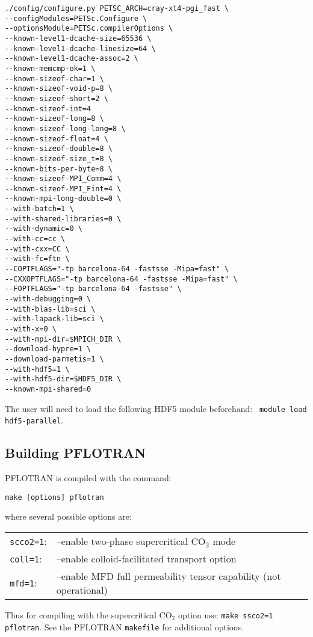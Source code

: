 \footnotesize
\begin{verbatim}
./config/configure.py PETSC_ARCH=cray-xt4-pgi_fast \
--configModules=PETSc.Configure \
--optionsModule=PETSc.compilerOptions \
--known-level1-dcache-size=65536 \
--known-level1-dcache-linesize=64 \
--known-level1-dcache-assoc=2 \
--known-memcmp-ok=1 \
--known-sizeof-char=1 \
--known-sizeof-void-p=8 \
--known-sizeof-short=2 \
--known-sizeof-int=4
--known-sizeof-long=8 \
--known-sizeof-long-long=8 \
--known-sizeof-float=4 \
--known-sizeof-double=8 \
--known-sizeof-size_t=8 \
--known-bits-per-byte=8 \
--known-sizeof-MPI_Comm=4 \
--known-sizeof-MPI_Fint=4 \
--known-mpi-long-double=0 \
--with-batch=1 \
--with-shared-libraries=0 \
--with-dynamic=0 \
--with-cc=cc \
--with-cxx=CC \
--with-fc=ftn \
--COPTFLAGS="-tp barcelona-64 -fastsse -Mipa=fast" \
--CXXOPTFLAGS="-tp barcelona-64 -fastsse -Mipa=fast" \
--FOPTFLAGS="-tp barcelona-64 -fastsse" \
--with-debugging=0 \
--with-blas-lib=sci \
--with-lapack-lib=sci \
--with-x=0 \
--with-mpi-dir=$MPICH_DIR \
--download-hypre=1 \
--download-parmetis=1 \
--with-hdf5=1 \
--with-hdf5-dir=$HDF5_DIR \
--known-mpi-shared=0
\end{verbatim}
\normalsize
The user will need to load the following HDF5 module beforehand: \ \verb|module load hdf5-parallel|.

\subsection{Building PFLOTRAN}
 
PFLOTRAN is compiled with the command:

\verb|make [options] pflotran|

\noindent
where several possible options are: 

\begin{tabular}{ll}
\verb|scco2=1|: & --enable two-phase supercritical CO$_2$ mode\\
\verb|coll=1|: & --enable colloid-facilitated transport option\\
\verb|mfd=1|: & --enable MFD full permeability tensor capability (not operational)
\end{tabular}

\noindent
Thus for compiling with the supercritical CO$_2$ option use: {\tt make ssco2=1 pflotran}.
See the PFLOTRAN \verb|makefile| for additional options.

